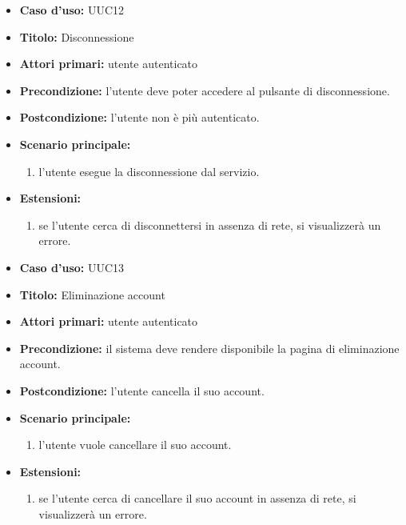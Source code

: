 \documentclass[casi-duso]{subfiles}
\begin{document}
\begin{itemize}
  \item \textbf{Caso d’uso:} UUC12
  \item \textbf{Titolo:} Disconnessione
  \item \textbf{Attori primari:} utente autenticato
  \item \textbf{Precondizione:} l'utente deve poter accedere al pulsante di disconnessione.
  \item \textbf{Postcondizione:} l'utente non è più autenticato.
  \item \textbf{Scenario principale:}
        \begin{enumerate}
          \item l'utente esegue la disconnessione dal servizio.
        \end{enumerate}
  \item \textbf{Estensioni:}
        \begin{enumerate}
          \item se l'utente cerca di disconnettersi in assenza di rete, si visualizzerà un errore.
        \end{enumerate}
\end{itemize}


\begin{itemize}
  \item \textbf{Caso d’uso:} UUC13
  \item \textbf{Titolo:} Eliminazione account
  \item \textbf{Attori primari:} utente autenticato
  \item \textbf{Precondizione:} il sistema deve rendere disponibile la pagina di eliminazione account.
  \item \textbf{Postcondizione:} l'utente cancella il suo account.
  \item \textbf{Scenario principale:}
        \begin{enumerate}
          \item l'utente vuole cancellare il suo account.
        \end{enumerate}
  \item \textbf{Estensioni:}
        \begin{enumerate}
          \item se l'utente cerca di cancellare il suo account in assenza di rete, si visualizzerà un errore.
        \end{enumerate}
\end{itemize}
\end{document}
